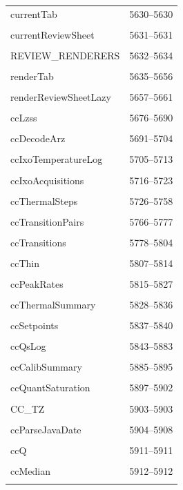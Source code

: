 {\begin{longtable}{@{}p{11cm}r@{}}
currentTab & 5630--5630 \\\\\hline
currentReviewSheet & 5631--5631 \\\\\hline
REVIEW\_RENDERERS & 5632--5634 \\\\\hline
renderTab & 5635--5656 \\\\\hline
renderReviewSheetLazy & 5657--5661 \\\\\hline
ccLzss & 5676--5690 \\\\\hline
ccDecodeArz & 5691--5704 \\\\\hline
ccIxoTemperatureLog & 5705--5713 \\\\\hline
ccIxoAcquisitions & 5716--5723 \\\\\hline
ccThermalSteps & 5726--5758 \\\\\hline
ccTransitionPairs & 5766--5777 \\\\\hline
ccTransitions & 5778--5804 \\\\\hline
ccThin & 5807--5814 \\\\\hline
ccPeakRates & 5815--5827 \\\\\hline
ccThermalSummary & 5828--5836 \\\\\hline
ccSetpoints & 5837--5840 \\\\\hline
ccQsLog & 5843--5883 \\\\\hline
ccCalibSummary & 5885--5895 \\\\\hline
ccQuantSaturation & 5897--5902 \\\\\hline
CC\_TZ & 5903--5903 \\\\\hline
ccParseJavaDate & 5904--5908 \\\\\hline
ccQ & 5911--5911 \\\\\hline
ccMedian & 5912--5912 \\\\\hline

\end{longtable}}
